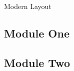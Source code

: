 \documentclass{article}
\begin{document}
\begin{center}
    {\Huge Modern Layout}
\end{center}

\vspace{1cm}

\begin{tcolorbox}[colback=gray!10,colframe=black]
\section*{Module One}
\lipsum[1]
\end{tcolorbox}

\vspace{0.5cm}

\begin{tcolorbox}[colback=gray!10,colframe=black]
\section*{Module Two}
\lipsum[2]
\end{tcolorbox}
\end{document}
